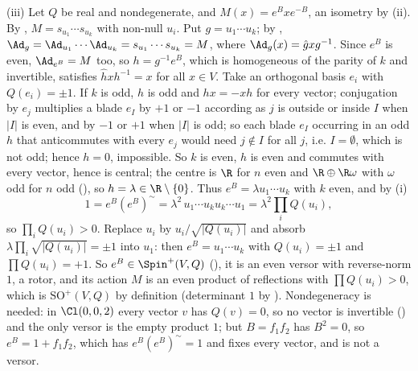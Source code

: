(iii) Let $Q$ be real and nondegenerate, and $M(x) = e^{B} x e^{-B}$, an isometry by (ii). By , $M = s_{u_1} \cdots s_{u_k}$ with non-null $u_i$. Put $g = u_1 \cdots u_k$; by , $\Ad_g = \Ad_{u_1} \cdots \Ad_{u_k} = s_{u_1}\cdots s_{u_k} = M$, where $\Ad_g(x) = \hat g x g^{-1}$. Since $e^{B}$ is even, $\Ad_{e^{B}} = M$ too, so $h = g^{-1}e^{B}$, which is homogeneous of the parity of $k$ and invertible, satisfies $\hat h x h^{-1} = x$ for all $x \in V$. Take an orthogonal basis $e_i$ with $Q(e_i) = \pm 1$. If $k$ is odd, $h$ is odd and $h x = -x h$ for every vector; conjugation by $e_j$ multiplies a blade $e_I$ by $+1$ or $-1$ according as $j$ is outside or inside $I$ when $\lvert I \rvert$ is even, and by $-1$ or $+1$ when $\lvert I \rvert$ is odd; so each blade $e_I$ occurring in an odd $h$ that anticommutes with every $e_j$ would need $j \notin I$ for all $j$, i.e. $I = \emptyset$, which is not odd; hence $h = 0$, impossible. So $k$ is even, $h$ is even and commutes with every vector, hence is central; the centre is $\R$ for $n$ even and $\R \oplus \R\omega$ with $\omega$ odd for $n$ odd (), so $h = \lambda \in \R \setminus \{0\}$. Thus $e^{B} = \lambda u_1 \cdots u_k$ with $k$ even, and by (i)
\[
1 = e^{B} (e^{B})^{\sim} = \lambda^{2}\, u_1 \cdots u_k u_k \cdots u_1 = \lambda^{2} \prod_i Q(u_i),
\]
so $\prod_i Q(u_i) > 0$. Replace $u_i$ by $u_i / \sqrt{\lvert Q(u_i) \rvert}$ and absorb $\lambda \prod_i \sqrt{\lvert Q(u_i)\rvert} = \pm 1$ into $u_1$: then $e^{B} = u_1 \cdots u_k$ with $Q(u_i) = \pm 1$ and $\prod Q(u_i) = +1$. So $e^{B} \in \Spin^{+}(V, Q)$ (), it is an even versor with reverse-norm $1$, a rotor, and its action $M$ is an even product of reflections with $\prod Q(u_i) > 0$, which is $\mathrm{SO}^{+}(V, Q)$ by definition (determinant $1$ by ). Nondegeneracy is needed: in $\Cl(0,0,2)$ every vector $v$ has $Q(v) = 0$, so no vector is invertible () and the only versor is the empty product $1$; but $B = f_1 f_2$ has $B^{2} = 0$, so $e^{B} = 1 + f_1 f_2$, which has $e^{B}(e^{B})^{\sim} = 1$ and fixes every vector, and is not a versor.

